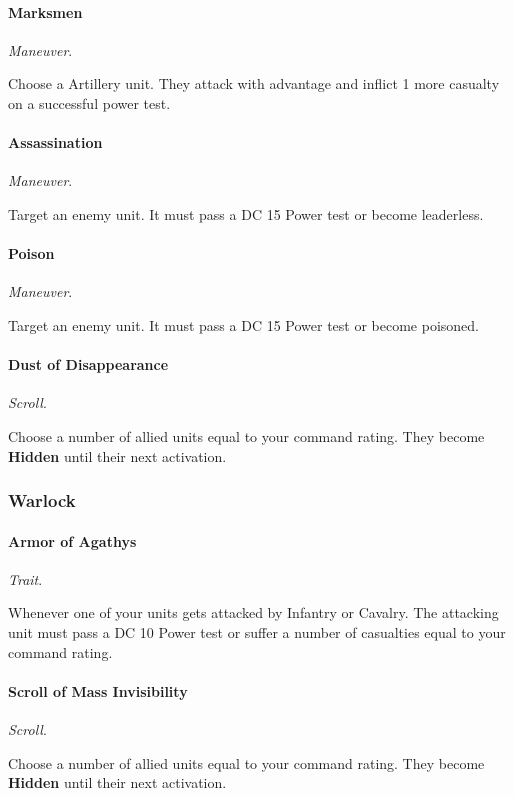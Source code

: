 \documentclass[letterpaper,twocolumn,openany,nodeprecatedcode]{dndbook}
\begin{document}
\paragraph{Marksmen}
\textit{Maneuver}.

Choose a Artillery unit.
They attack with advantage and inflict 1 more casualty on a successful power test.

\paragraph{Assassination}
\textit{Maneuver}.

Target an enemy unit.
It must pass a DC 15 Power test or become leaderless.

\paragraph{Poison}
\textit{Maneuver}.

Target an enemy unit.
It must pass a DC 15 Power test or become poisoned.

\paragraph{Dust of Disappearance}
\textit{Scroll}.

Choose a number of allied units equal to your command rating.
They become \textbf{Hidden} until their next activation.

\subsubsection{Warlock}

\paragraph{Armor of Agathys}
\textit{Trait}.

Whenever one of your units gets attacked by Infantry or Cavalry.
The attacking unit must pass a DC 10 Power test
or suffer a number of casualties equal to your command rating.

\paragraph{Scroll of Mass Invisibility}
\textit{Scroll}.

Choose a number of allied units equal to your command rating.
They become \textbf{Hidden} until their next activation.
\end{document}
